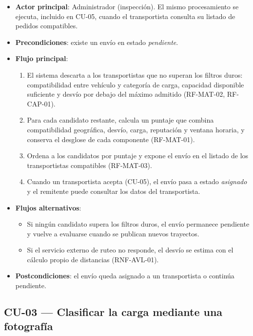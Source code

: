 {\begin{itemize}[leftmargin=2em]
    \item \textbf{Actor principal}: Administrador (inspección). El mismo procesamiento se ejecuta, incluido en CU-05, cuando el transportista consulta su listado de pedidos compatibles.
    \item \textbf{Precondiciones}: existe un envío en estado \emph{pendiente}.
    \item \textbf{Flujo principal}:
    \begin{enumerate}[leftmargin=2em]
        \item El sistema descarta a los transportistas que no superan los filtros duros: compatibilidad entre vehículo y categoría de carga, capacidad disponible suficiente y desvío por debajo del máximo admitido (RF-MAT-02, RF-CAP-01).
        \item Para cada candidato restante, calcula un puntaje que combina compatibilidad geográfica, desvío, carga, reputación y ventana horaria, y conserva el desglose de cada componente (RF-MAT-01).
        \item Ordena a los candidatos por puntaje y expone el envío en el listado de los transportistas compatibles (RF-MAT-03).
        \item Cuando un transportista acepta (CU-05), el envío pasa a estado \emph{asignado} y el remitente puede consultar los datos del transportista.
    \end{enumerate}
    \item \textbf{Flujos alternativos}:
    \begin{itemize}[leftmargin=2em]
        \item[1a.] Si ningún candidato supera los filtros duros, el envío permanece pendiente y vuelve a evaluarse cuando se publican nuevos trayectos.
        \item[2a.] Si el servicio externo de ruteo no responde, el desvío se estima con el cálculo propio de distancias (RNF-AVL-01).
    \end{itemize}
    \item \textbf{Postcondiciones}: el envío queda asignado a un transportista o continúa pendiente.
\end{itemize}

\subsection{CU-03 --- Clasificar la carga mediante una fotografía}

}
